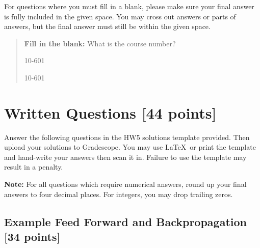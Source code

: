 \documentclass[11pt]{exam}
\numberwithin{equation}{section} %
\numberwithin{figure}{section} %
\numberwithin{table}{section} %
\begin{document}
For questions where you must fill in a blank, please make sure your final answer is fully included in the given space. You may cross out answers or parts of answers, but the final answer must still be within the given space.

\begin{quote}
\textbf{Fill in the blank:} What is the course number?

\begin{tcolorbox}[fit,height=1cm, width=4cm, blank, borderline={1pt}{-2pt},nobeforeafter]
    \begin{center}\huge10-601\end{center}
    \end{tcolorbox}\hspace{2cm}
    \begin{tcolorbox}[fit,height=1cm, width=4cm, blank, borderline={1pt}{-2pt},nobeforeafter]
    \begin{center}\huge10-601\end{center}
    \end{tcolorbox}
\end{quote}

\clearpage
\section{Written Questions [44 points]}
\label{sec:written}

Answer the following questions in the HW5 solutions template provided.  Then upload your solutions to Gradescope. You may use \LaTeX\ or print the template and hand-write your answers then scan it in. Failure to use the template may result in a penalty.

\textbf{Note:} For all questions which require numerical answers, round up your final answers to four decimal places. For integers, you may drop trailing zeros.

\subsection{Example Feed Forward and Backpropagation [34 points]}
\label{sec:onelayertoy}
\end{document}
